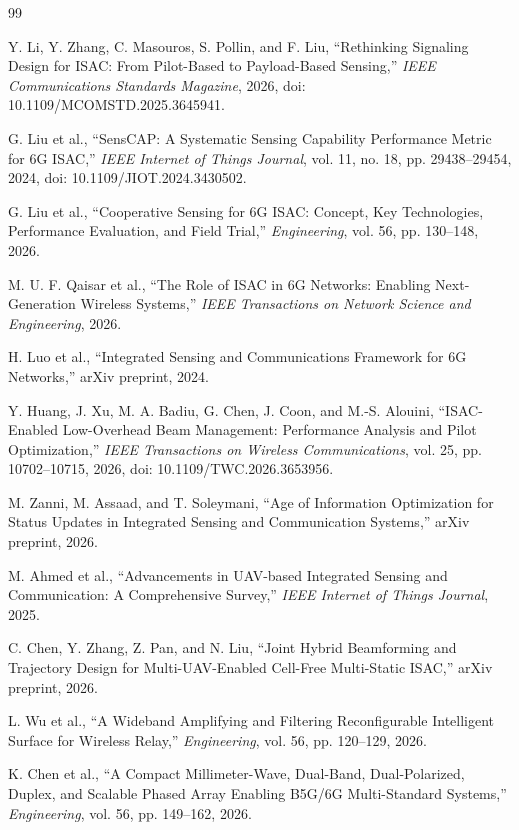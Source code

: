 \documentclass[12pt,a4paper]{article}
\begin{document}
\begin{thebibliography}{99}

Y. Li, Y. Zhang, C. Masouros, S. Pollin, and F. Liu, ``Rethinking Signaling Design for ISAC: From Pilot-Based to Payload-Based Sensing,'' \textit{IEEE Communications Standards Magazine}, 2026, doi: 10.1109/MCOMSTD.2025.3645941.

G. Liu et al., ``SensCAP: A Systematic Sensing Capability Performance Metric for 6G ISAC,'' \textit{IEEE Internet of Things Journal}, vol. 11, no. 18, pp. 29438--29454, 2024, doi: 10.1109/JIOT.2024.3430502.

G. Liu et al., ``Cooperative Sensing for 6G ISAC: Concept, Key Technologies, Performance Evaluation, and Field Trial,'' \textit{Engineering}, vol. 56, pp. 130--148, 2026.

M. U. F. Qaisar et al., ``The Role of ISAC in 6G Networks: Enabling Next-Generation Wireless Systems,'' \textit{IEEE Transactions on Network Science and Engineering}, 2026.

H. Luo et al., ``Integrated Sensing and Communications Framework for 6G Networks,'' arXiv preprint, 2024.

Y. Huang, J. Xu, M. A. Badiu, G. Chen, J. Coon, and M.-S. Alouini, ``ISAC-Enabled Low-Overhead Beam Management: Performance Analysis and Pilot Optimization,'' \textit{IEEE Transactions on Wireless Communications}, vol. 25, pp. 10702--10715, 2026, doi: 10.1109/TWC.2026.3653956.

M. Zanni, M. Assaad, and T. Soleymani, ``Age of Information Optimization for Status Updates in Integrated Sensing and Communication Systems,'' arXiv preprint, 2026.

M. Ahmed et al., ``Advancements in UAV-based Integrated Sensing and Communication: A Comprehensive Survey,'' \textit{IEEE Internet of Things Journal}, 2025.

C. Chen, Y. Zhang, Z. Pan, and N. Liu, ``Joint Hybrid Beamforming and Trajectory Design for Multi-UAV-Enabled Cell-Free Multi-Static ISAC,'' arXiv preprint, 2026.

L. Wu et al., ``A Wideband Amplifying and Filtering Reconfigurable Intelligent Surface for Wireless Relay,'' \textit{Engineering}, vol. 56, pp. 120--129, 2026.

K. Chen et al., ``A Compact Millimeter-Wave, Dual-Band, Dual-Polarized, Duplex, and Scalable Phased Array Enabling B5G/6G Multi-Standard Systems,'' \textit{Engineering}, vol. 56, pp. 149--162, 2026.


\end{thebibliography}
\end{document}
